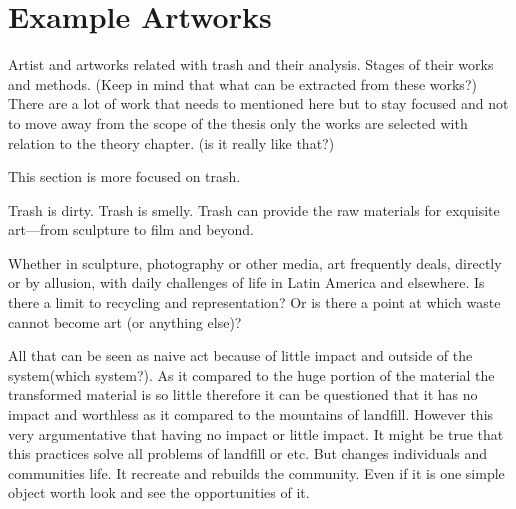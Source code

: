 \section{Example Artworks}
Artist and artworks related with trash and their analysis. Stages of their works and methods. (Keep in mind that what can be extracted from these works?) There are a lot of work that needs to mentioned here but to stay focused and not to move away from the scope of the thesis only the works are selected with relation to the theory chapter. (is it really like that?) 

This section is more focused on trash.

Trash is dirty. Trash is smelly. Trash can provide the raw materials for exquisite art---from sculpture to film and beyond.

Whether in sculpture, photography or other media, art frequently deals, directly or by allusion, with daily challenges of life in Latin America and elsewhere. Is there a limit to recycling and representation? Or is there a point at which waste cannot become art (or anything else)?

All that can be seen as naive act because of little impact and outside of the system(which system?). As it compared to the huge portion of the material the transformed material is so little therefore it can be questioned that it has no impact and worthless as it compared to the mountains of landfill. However this very argumentative that having no impact or little impact. It might be true that this practices solve all problems of landfill or etc. But changes individuals and communities life. It recreate and rebuilds the community. Even if it is one simple object worth look and see the opportunities of it. 

